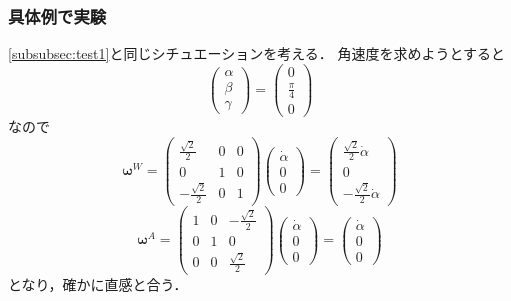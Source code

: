 \subsubsection{具体例で実験}
\autoref{subsubsec:test1}と同じシチュエーションを考える．
角速度を求めようとすると
\begin{equation}
  \begin{pmatrix}
    \alpha \\
    \beta \\
    \gamma
  \end{pmatrix} =
  \begin{pmatrix}
    0 \\
    \frac{\pi}{4} \\
    0
  \end{pmatrix}
\end{equation}
なので
\begin{equation}
  \boldsymbol{\omega}^{W} =
  \begin{pmatrix}
    \frac{\sqrt{2}}{2} & 0 & 0 \\
    0 & 1 & 0 \\
    - \frac{\sqrt{2}}{2} & 0 & 1
  \end{pmatrix}
  \begin{pmatrix}
    \dot{\alpha} \\
    0 \\
    0
  \end{pmatrix} =
  \begin{pmatrix}
    \frac{\sqrt{2}}{2} \dot{\alpha} \\
    0 \\
    -\frac{\sqrt{2}}{2} \dot{\alpha}
  \end{pmatrix}
\end{equation}
\begin{equation}
  \boldsymbol{\omega}^{A} =
  \begin{pmatrix}
    1 & 0 & - \frac{\sqrt{2}}{2} \\
    0 & 1 & 0 \\
    0 & 0 & \frac{\sqrt{2}}{2}
  \end{pmatrix}
  \begin{pmatrix}
    \dot{\alpha} \\
    0 \\
    0
  \end{pmatrix} =
  \begin{pmatrix}
    \dot{\alpha} \\
    0 \\
    0
  \end{pmatrix}
\end{equation}
となり，確かに直感と合う．

